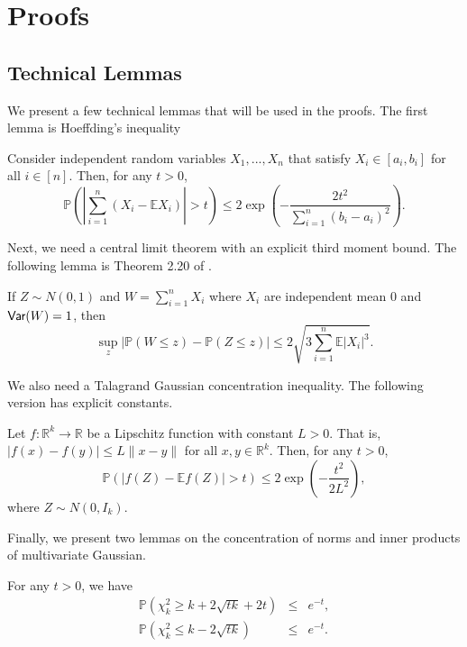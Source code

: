 
\appendix

\section{Proofs}
\label{sec:proof}

\subsection{Technical Lemmas}

We present a few technical lemmas that will be used in the proofs. The first lemma is Hoeffding's inequality
\begin{lemma}\label{lem:hoeffding}
Consider independent random variables $X_1,...,X_n$ that satisfy $X_i\in[a_i,b_i]$ for all $i\in[n]$. Then, for any $t>0$,
$$\mathbb{P}\left(\left|\sum_{i=1}^n(X_i-\mathbb{E}X_i)\right|>t\right) \leq 2\exp\left(-\frac{2t^2}{\sum_{i=1}^n(b_i-a_i)^2}\right).$$
\end{lemma}

Next, we need a central limit theorem with an explicit third moment bound. The following lemma is Theorem 2.20 of \cite{ross2007second}.
\begin{lemma}\label{lem:stein}
If $Z\sim N(0,1)$ and $W=\sum_{i=1}^nX_i$ where $X_i$ are independent mean $0$ and $\textsf{Var}(W)=1$, then
$$\sup_z\left|\mathbb{P}(W\leq z)-\mathbb{P}(Z\leq z)\right|\leq 2\sqrt{3\sum_{i=1}^n\mathbb{E}|X_i|^3}.$$
\end{lemma}

We also need a Talagrand Gaussian concentration inequality. The following version has explicit constants.
\begin{lemma}\label{lem:talagrand}
Let $f:\mathbb{R}^k\rightarrow\mathbb{R}$ be a Lipschitz function with constant $L>0$. That is, $|f(x)-f(y)|\leq L\|x-y\|$ for all $x,y\in\mathbb{R}^k$. Then, for any $t>0$,
$$\mathbb{P}\left(|f(Z)-\mathbb{E}f(Z)|>t\right)\leq 2\exp\left(-\frac{t^2}{2L^2}\right),$$
where $Z\sim N(0,I_k)$.
\end{lemma}

Finally, we present two lemmas on the concentration of norms and inner products of multivariate Gaussian.
\begin{lemma}\label{lem:chi-squared}
For any $t>0$, we have
\begin{eqnarray*}
\mathbb{P}\left(\chi_k^2\geq k+2\sqrt{tk}+2t\right) &\leq& e^{-t}, \\
\mathbb{P}\left(\chi_k^2\leq k-2\sqrt{tk}\right) &\leq& e^{-t}.
\end{eqnarray*}
\end{lemma}

